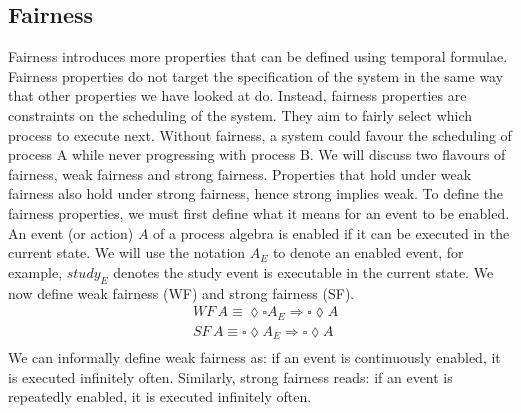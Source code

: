 \subsection{Fairness}
Fairness introduces more properties that can be defined using temporal formulae. Fairness properties do not target the specification of the system in the same way that other properties we have looked at do. Instead, fairness properties are constraints on the scheduling of the system. They aim to fairly select which process to execute next. Without fairness, a system could favour the scheduling of process A while never progressing with process B. We will discuss two flavours of fairness, weak fairness and strong fairness. Properties that hold under weak fairness also hold under strong fairness, hence strong implies weak. To define the fairness properties, we must first define what it means for an event to be enabled. An event (or action) $A$ of a process algebra is enabled if it can be executed in the current state. We will use the notation $A_E$ to denote an enabled event, for example, $study_E$ denotes the study event is executable in the current state. We now define weak fairness (WF) and strong fairness (SF).
\[
\begin{aligned}
&WF \, A \equiv \lozenge \square A_E \Rightarrow \square \lozenge A \\
&SF \, A \equiv \square \lozenge A_E \Rightarrow \square \lozenge A \\
\end{aligned}
\]
We can informally define weak fairness as: if an event is continuously enabled, it is executed infinitely often. Similarly, strong fairness reads: if an event is repeatedly enabled, it is executed infinitely often.
